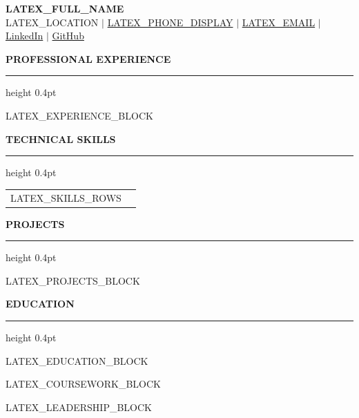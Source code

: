 \documentclass[10pt,letterpaper]{article}
\newcommand{\resumesection}[1]{
    \par\noindent
    \vspace{6pt}
    {\large\textbf{#1}}
    \vspace{3pt}
    \hrule height 0.4pt
    \vspace{3pt}
}
\begin{document}
\begin{center}
    {\LARGE\textbf{LATEX_FULL_NAME}}\\
    \vspace{2pt}
    LATEX_LOCATION $|$
    \href{tel:LATEX_PHONE_RAW}{LATEX_PHONE_DISPLAY} $|$
    \href{mailto:LATEX_EMAIL}{LATEX_EMAIL} $|$
    \href{LATEX_LINKEDIN_URL}{LinkedIn} $|$
    \href{LATEX_GITHUB_URL}{GitHub}
\end{center}

\resumesection{PROFESSIONAL EXPERIENCE}
LATEX_EXPERIENCE_BLOCK

\resumesection{TECHNICAL SKILLS}
\begin{tabular}{@{}p{1.7in}p{5.0in}@{}}
LATEX_SKILLS_ROWS
\end{tabular}

\resumesection{PROJECTS}
LATEX_PROJECTS_BLOCK

\resumesection{EDUCATION}
LATEX_EDUCATION_BLOCK

LATEX_COURSEWORK_BLOCK

LATEX_LEADERSHIP_BLOCK
\end{document}
